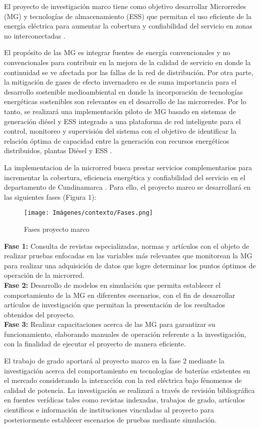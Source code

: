 El proyecto de investigación marco tiene como objetivo desarrollar Microrredes (MG) y tecnologías de almacenamiento (ESS) que permitan el uso eficiente de la energía eléctrica  para aumentar la cobertura y confiabilidad del servicio en zonas no interconectadas \cite{microgrid}.

El propósito de las MG es integrar fuentes de energía convencionales y no convencionales para contribuir en la mejora de la calidad de servicio en donde la continuidad se ve afectada por las fallas de la red de distribución. Por otra parte, la mitigación de gases de efecto invernadero es de suma importancia para el desarrollo sostenible medioambiental en donde la incorporación de tecnologías energéticas sostenibles son relevantes en el desarrollo de las microrredes. Por lo tanto, se realizará una implementación  piloto de MG basado en sistemas de generación diésel y ESS integrado a una plataforma de red inteligente para el control, monitoreo y supervisión del sistema con el objetivo de identificar la relación óptima de capacidad entre la generación con recursos energéticos distribuidos, plantas Diésel y ESS   \cite{microgrid}.

La implementacion de la microrred busca prestar servicios complementarios para incrementar la cobertura, eficiencia energética y confiabilidad del servicio en el departamento de Cundinamarca \cite{microgrid}. Para ello, el proyecto marco se desarrollará en las siguientes fases (Figura 1):
\newpage
\begin{figure}[h!]
    \begin{center}
    \centering
    \texttt{[image: Imágenes/contexto/Fases.png]}
	\caption{ Fases proyecto marco}
    \end{center}
\end{figure}

\textbf{Fase 1: } Consulta de revistas especializadas, normas y artículos con el objeto de realizar pruebas enfocadas en las variables más relevantes que monitorean la MG para realizar una adquisición de datos que logre determinar los puntos óptimos de operación de la microrred.\\

\textbf{Fase 2: } Desarrollo de  modelos en simulación que permita establecer el comportamiento de la MG en diferentes escenarios, con el fin de desarrollar  artículos de investigación que permitan la presentación de los resultados obtenidos del proyecto.\\

\textbf{Fase 3: } Realizar capacitaciones acerca de las MG para garantizar su funcionamiento,  elaborando manuales de operación referente a la investigación, con la finalidad de ejecutar el proyecto de manera eficiente.


El trabajo de grado aportará al proyecto marco en la fase 2 mediante la investigación acerca del comportamiento en tecnologías de baterías existentes en el mercado considerando la  interacción con la red eléctrica bajo fénomenos de calidad de potencia. La investigación se realizará a través de revisión bibliográfica en fuentes verídicas tales como revistas indexadas, trabajos de grado, artículos científicos e información de instituciones vinculadas al proyecto para posteriormente establecer escenarios de pruebas mediante simulación.